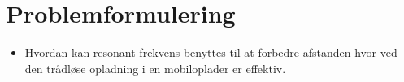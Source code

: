 \section{Problemformulering}

\begin{itemize}

\item Hvordan kan resonant frekvens benyttes til at forbedre afstanden hvor ved den trådløse opladning i en mobiloplader er effektiv.

\end{itemize}
